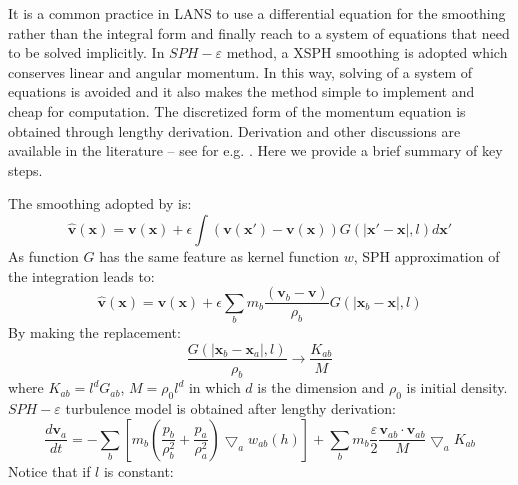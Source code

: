 It is a common practice in LANS to use a differential equation for the smoothing rather than the integral form and finally reach to a system of equations that need to be solved implicitly. In $SPH-\varepsilon$ method, a XSPH \citep{monaghan1989problem} smoothing is adopted which conserves linear and angular momentum. In this way, solving of a system of equations is avoided and it also makes the method simple to implement and cheap for computation. 
The discretized form of the momentum equation is obtained through lengthy derivation. Derivation and other discussions are available in the literature -- see for e.g. \citep{monaghan2011turbulence}. Here we provide a brief summary of key steps.

The smoothing adopted by \citet{monaghan2011turbulence}  is:
\begin{equation}
\widehat{\textbf{v}}\left(\textbf{x}\right)=\textbf{v}\left(\textbf{x}\right)+ \epsilon \int \left(\textbf{v}\left(\textbf{x} \prime\right)-\textbf{v}\left(\textbf{x}\right)\right)G\left(\vert \textbf{x} \prime - \textbf{x} \vert, l\right) d\textbf{x} \prime
\end{equation}
As function $G$ has the same feature as kernel function $w$, SPH approximation of the integration leads to:
\begin{equation} \label{eq:SPH-epsilon-filtering}
\widehat{\textbf{v}}\left(\textbf{x}\right)=\textbf{v}\left(\textbf{x}\right)+\epsilon \sum_b m_b \dfrac{\left(\textbf{v}_b -\textbf{v}\right)}{\rho _b} G\left(\vert \textbf{x} _b - \textbf{x} \vert, l\right)
\end{equation}
By making the replacement:
\begin{equation}
\label{eq:replacement-in-turb-derive}
\dfrac{G\left(\vert \textbf{x} _b - \textbf{x} _a \vert, l\right)}{\rho _b} \rightarrow \dfrac{K_{ab}}{M}
\end{equation}
where $K_{ab} = l^d G_{ab}$, $M = \rho_0 l^d$ in which $d$ is the dimension and $\rho_0$ is initial density. $SPH-\varepsilon$ turbulence model is obtained after lengthy derivation:
\begin{equation}
\label{eq:monaghan-mom-turb}
\dfrac{d \textbf{v}_a}{dt} = -\sum_b \left[ m_b \left(\dfrac{p_b}{\rho_b^2} + \dfrac{p_a}{\rho_a^2}\right) \bigtriangledown_aw_{a b}\left(h\right)\right] + \sum_b m_b \dfrac{\varepsilon}{2} \dfrac{\textbf{v}_{ab} \cdot \textbf{v}_{ab}}{M} \bigtriangledown_a K_{ab}
\end{equation}
Notice that if $l$ is constant: 
